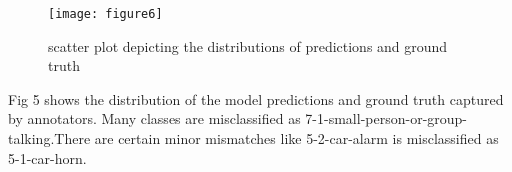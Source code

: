         	\begin{figure}[h!]
    	\texttt{[image: figure6]}
    	\caption{scatter plot depicting the distributions of predictions and ground truth}
    \end{figure}
    
    Fig 5 shows the distribution of the model predictions and ground truth captured by annotators. Many classes are misclassified as 7-1-small-person-or-group-talking.There are certain minor mismatches like 5-2-car-alarm is misclassified as 5-1-car-horn. 

	
	
